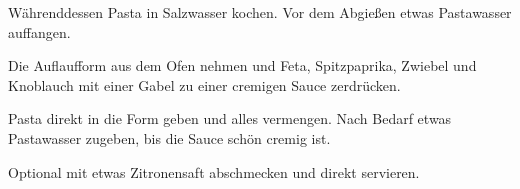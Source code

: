 \begin{recipe}
{    \step%
    Währenddessen Pasta in Salzwasser kochen. Vor dem Abgießen etwas Pastawasser auffangen.
    
    \step%
    Die Auflaufform aus dem Ofen nehmen und Feta, Spitzpaprika, Zwiebel und Knoblauch mit einer Gabel zu einer cremigen Sauce zerdrücken.
    
    \step%
    Pasta direkt in die Form geben und alles vermengen. Nach Bedarf etwas Pastawasser zugeben, bis die Sauce schön cremig ist.
    
    \step%
    Optional mit etwas Zitronensaft abschmecken und direkt servieren.
}



\end{recipe}